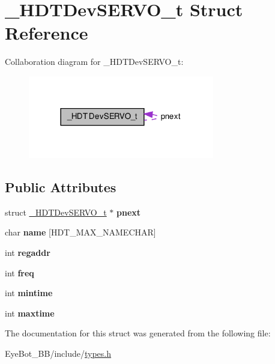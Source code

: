 \hypertarget{struct___h_d_t_dev_s_e_r_v_o__t}{\section{\-\_\-\-H\-D\-T\-Dev\-S\-E\-R\-V\-O\-\_\-t \-Struct \-Reference}
\label{struct___h_d_t_dev_s_e_r_v_o__t}
}


\-Collaboration diagram for \-\_\-\-H\-D\-T\-Dev\-S\-E\-R\-V\-O\-\_\-t\-:\nopagebreak
\begin{figure}[H]
\begin{center}
\leavevmode
\includegraphics[width=230pt]{struct___h_d_t_dev_s_e_r_v_o__t__coll__graph}
\end{center}
\end{figure}
\subsection*{\-Public \-Attributes}
\begin{DoxyCompactItemize}
\item 
\hypertarget{struct___h_d_t_dev_s_e_r_v_o__t_a8b702d5cb639264b114e451f5d49cf11}{struct \hyperlink{struct___h_d_t_dev_s_e_r_v_o__t}{\-\_\-\-H\-D\-T\-Dev\-S\-E\-R\-V\-O\-\_\-t} $\ast$ {\bfseries pnext}}\label{struct___h_d_t_dev_s_e_r_v_o__t_a8b702d5cb639264b114e451f5d49cf11}

\item 
\hypertarget{struct___h_d_t_dev_s_e_r_v_o__t_a7a1693597f88cb63e8d5250adb2e1ff0}{char {\bfseries name} \mbox{[}\-H\-D\-T\-\_\-\-M\-A\-X\-\_\-\-N\-A\-M\-E\-C\-H\-A\-R\mbox{]}}\label{struct___h_d_t_dev_s_e_r_v_o__t_a7a1693597f88cb63e8d5250adb2e1ff0}

\item 
\hypertarget{struct___h_d_t_dev_s_e_r_v_o__t_a99da94562a05ddcb6748640d7166713c}{int {\bfseries regaddr}}\label{struct___h_d_t_dev_s_e_r_v_o__t_a99da94562a05ddcb6748640d7166713c}

\item 
\hypertarget{struct___h_d_t_dev_s_e_r_v_o__t_a9c39bf2e75219472e95d8920fc9998dd}{int {\bfseries freq}}\label{struct___h_d_t_dev_s_e_r_v_o__t_a9c39bf2e75219472e95d8920fc9998dd}

\item 
\hypertarget{struct___h_d_t_dev_s_e_r_v_o__t_ab06df51ef66685a25cb186a6ec6d90e9}{int {\bfseries mintime}}\label{struct___h_d_t_dev_s_e_r_v_o__t_ab06df51ef66685a25cb186a6ec6d90e9}

\item 
\hypertarget{struct___h_d_t_dev_s_e_r_v_o__t_a76730f00da586dfcb9a3259b060c59db}{int {\bfseries maxtime}}\label{struct___h_d_t_dev_s_e_r_v_o__t_a76730f00da586dfcb9a3259b060c59db}

\end{DoxyCompactItemize}


\-The documentation for this struct was generated from the following file\-:\begin{DoxyCompactItemize}
\item 
\-Eye\-Bot\-\_\-\-B\-B/include/\hyperlink{types_8h}{types.\-h}\end{DoxyCompactItemize}
